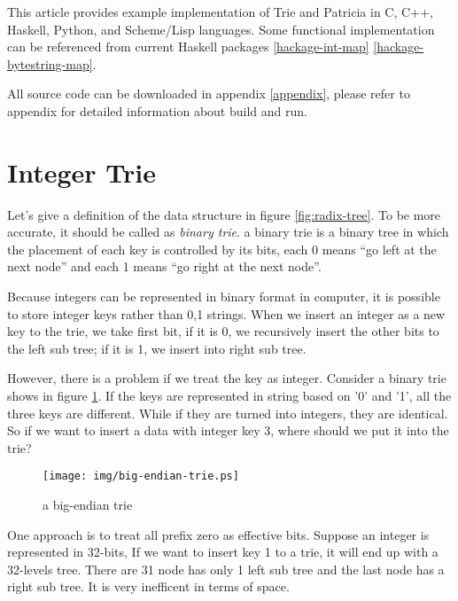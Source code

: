 \documentclass{article}
\begin{document}
This article provides example implementation of Trie and Patricia 
in C, C++, Haskell, Python, and Scheme/Lisp languages. Some functional
implementation can be referenced from current Haskell packages \ref{hackage-int-map} 
\ref{hackage-bytestring-map}.

All source code can be downloaded in appendix \ref{appendix}, please 
refer to appendix for detailed information about build and run.

\section{Integer Trie}
\label{int-trie}

Let's give a definition of the data structure in figure \ref{fig:radix-tree}.
To be more accurate, it should be called as \emph{binary trie}. a binary
trie is a binary tree in which the placement of each key is controlled by
its bits, each 0 means ``go left at the next node'' and each 1 means ``go
right at the next node''\cite{okasaki-int-map}.

Because integers can be represented in binary format in computer, it is 
possible to store integer keys rather than 0,1 strings. When we insert an
integer as a new key to the trie, we take first bit, if it is 0, we recursively
insert the other bits to the left sub tree; if it is 1, we insert into right
sub tree.

However, there is a problem if we treat the key as integer. Consider a binary
trie shows in figure \ref{fig:big-endian-trie}. If the keys are represented in 
string based on '0' and '1', all the three keys are different. While if they are
turned into integers, they are identical. So if we want to insert a data with integer
key 3, where should we put it into the trie?

\begin{figure}[htbp]
       \begin{center}
	\texttt{[image: img/big-endian-trie.ps]}
        \caption{a big-endian trie} \label{fig:big-endian-trie}
       \end{center}
\end{figure}

One approach is to treat all prefix zero as effective bits.
Suppose an integer is represented in 32-bits, If we want to insert key 1 to a trie, 
it will end up with a 32-levels tree. 
There are 31 node has only 1 left sub tree and the last node has
a right sub tree. It is very inefficent in terms of space.
\end{document}

